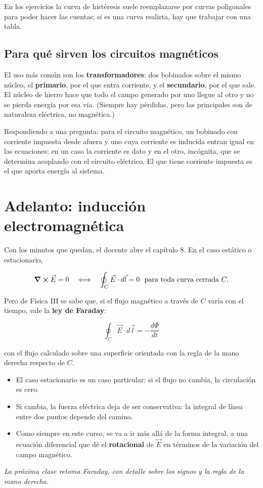 \documentclass[12pt,a4paper]{article}
\begin{document}
En los ejercicios la curva de histéresis suele reemplazarse por curvas
poligonales para poder hacer las cuentas; si es una curva realista, hay que
trabajar con una tabla.

\subsection{Para qué sirven los circuitos magnéticos}

El uso más común son los \textbf{transformadores}: dos bobinados sobre el mismo
núcleo, el \textbf{primario}, por el que entra corriente, y el \textbf{secundario}, por
el que sale. El núcleo de hierro hace que todo el campo generado por uno llegue
al otro y no se pierda energía por esa vía. (Siempre hay pérdidas, pero las
principales son de naturaleza eléctrica, no magnética.)

Respondiendo a una pregunta: para el circuito magnético, un bobinado con
corriente impuesta desde afuera y uno cuya corriente es inducida entran igual
en las ecuaciones; en un caso la corriente es dato y en el otro, incógnita, que
se determina acoplando con el circuito eléctrico. El que tiene corriente
impuesta es el que aporta energía al sistema.

\section{Adelanto: inducción electromagnética}

Con los minutos que quedan, el docente abre el capítulo 8. En el caso estático
o estacionario,

\[
\curl\vec E = 0 \quad\Longleftrightarrow\quad \oint_C\vec E\cdot d\vec l = 0
\ \text{ para toda curva cerrada } C .
\]

Pero de Física III se sabe que, si el flujo magnético a través de $C$ varía con
el tiempo, vale la \textbf{ley de Faraday}:

\begin{keybox}
\[
\boxed{\ \oint_C\vec E\cdot d\vec l = -\frac{d\Phi}{dt}\ }
\]
\end{keybox}
con el flujo calculado sobre una superficie orientada con la regla de la mano
derecha respecto de $C$.

\begin{itemize}
  \item El caso estacionario es un caso particular: si el flujo no cambia, la
  circulación es cero.
  \item Si cambia, la fuerza eléctrica deja de ser conservativa: la integral de línea
  entre dos puntos depende del camino.
  \item Como siempre en este curso, se va a ir más allá de la forma integral, a una
  ecuación diferencial que dé el \textbf{rotacional} de $\vec E$ en términos de la
  variación del campo magnético.
\end{itemize}

\noindent\emph{La próxima clase retoma Faraday, con detalle sobre los signos y la regla de la
mano derecha.}
\end{document}
